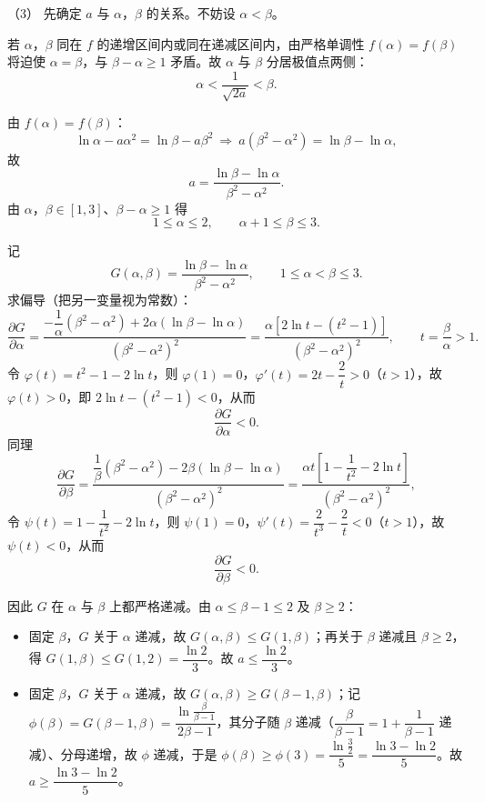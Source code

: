 \begin{answer}
（3） 先确定 $a$ 与 $\alpha$，$\beta$ 的关系。不妨设 $\alpha<\beta$。

若 $\alpha$，$\beta$ 同在 $f$ 的递增区间内或同在递减区间内，由严格单调性 $f(\alpha)=f(\beta)$ 将迫使 $\alpha=\beta$，与 $\beta-\alpha\geqslant1$ 矛盾。故 $\alpha$ 与 $\beta$ 分居极值点两侧：
\nopagebreak[4]
\[\alpha<\frac{1}{\sqrt{2a}}<\beta.\]

由 $f(\alpha)=f(\beta)$：
\nopagebreak[4]
\[\ln\alpha-a\alpha^2=\ln\beta-a\beta^2\ \Longrightarrow\ a\left(\beta^2-\alpha^2\right)=\ln\beta-\ln\alpha,\]
故
\nopagebreak[4]
\[a=\frac{\ln\beta-\ln\alpha}{\beta^2-\alpha^2}.\]
由 $\alpha$，$\beta\in[1,3]$、$\beta-\alpha\geqslant1$ 得
\nopagebreak[4]
\[1\leqslant\alpha\leqslant2,\qquad \alpha+1\leqslant\beta\leqslant3.\]

记
\nopagebreak[4]
\[G(\alpha,\beta)=\frac{\ln\beta-\ln\alpha}{\beta^2-\alpha^2},\qquad 1\leqslant\alpha<\beta\leqslant3.\]
求偏导（把另一变量视为常数）：
\nopagebreak[4]
\[\frac{\partial G}{\partial\alpha}=\frac{-\dfrac1\alpha\left(\beta^2-\alpha^2\right)+2\alpha\left(\ln\beta-\ln\alpha\right)}{\left(\beta^2-\alpha^2\right)^2}
=\frac{\alpha\left[2\ln t-(t^2-1)\right]}{\left(\beta^2-\alpha^2\right)^2},\qquad t=\frac\beta\alpha>1.\]
令 $\varphi(t)=t^2-1-2\ln t$，则 $\varphi(1)=0$，$\varphi'(t)=2t-\dfrac2t>0$（$t>1$），故 $\varphi(t)>0$，即 $2\ln t-(t^2-1)<0$，从而
\nopagebreak[4]
\[\frac{\partial G}{\partial\alpha}<0.\]
同理
\nopagebreak[4]
\[\frac{\partial G}{\partial\beta}=\frac{\dfrac1\beta\left(\beta^2-\alpha^2\right)-2\beta\left(\ln\beta-\ln\alpha\right)}{\left(\beta^2-\alpha^2\right)^2}
=\frac{\alpha t\left[1-\dfrac1{t^2}-2\ln t\right]}{\left(\beta^2-\alpha^2\right)^2},\]
令 $\psi(t)=1-\dfrac1{t^2}-2\ln t$，则 $\psi(1)=0$，$\psi'(t)=\dfrac{2}{t^3}-\dfrac2t<0$（$t>1$），故 $\psi(t)<0$，从而
\nopagebreak[4]
\[\frac{\partial G}{\partial\beta}<0.\]

因此 $G$ 在 $\alpha$ 与 $\beta$ 上都严格递减。由 $\alpha\leqslant\beta-1\leqslant2$ 及 $\beta\geqslant2$：

\begin{itemize}
\item 固定 $\beta$，$G$ 关于 $\alpha$ 递减，故 $G(\alpha,\beta)\leqslant G(1,\beta)$；再关于 $\beta$ 递减且 $\beta\geqslant2$，得 $G(1,\beta)\leqslant G(1,2)=\dfrac{\ln2}{3}$。故 $a\leqslant\dfrac{\ln2}{3}$。
\item 固定 $\beta$，$G$ 关于 $\alpha$ 递减，故 $G(\alpha,\beta)\geqslant G(\beta-1,\beta)$；记 $\phi(\beta)=G(\beta-1,\beta)=\dfrac{\ln\frac{\beta}{\beta-1}}{2\beta-1}$，其分子随 $\beta$ 递减（$\dfrac{\beta}{\beta-1}=1+\dfrac1{\beta-1}$ 递减）、分母递增，故 $\phi$ 递减，于是 $\phi(\beta)\geqslant\phi(3)=\dfrac{\ln\frac32}{5}=\dfrac{\ln3-\ln2}{5}$。故 $a\geqslant\dfrac{\ln3-\ln2}{5}$。
\end{itemize}


\end{answer}
